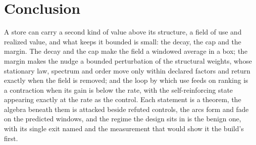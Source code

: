 \documentclass[11pt,a4paper]{article}
\theoremstyle{plain}
\theoremstyle{definition}
\begin{document}
\section{Conclusion}

A store can carry a second kind of value above its structure, a field of use and realized value,
and what keeps it bounded is small: the decay, the cap and the margin. The decay and the cap
make the field a windowed average in a box; the margin makes the nudge a bounded perturbation of
the structural weights, whose stationary law, spectrum and order move only within declared factors
and return exactly when the field is removed; and the loop by which use feeds on ranking is a
contraction when its gain is below the rate, with the self-reinforcing state appearing exactly at
the rate as the control. Each statement is a theorem, the algebra beneath them is attacked beside
refuted controls, the arcs form and fade on the predicted windows, and the regime the design sits
in is the benign one, with its single exit named and the measurement that would show it the
build's first.



\end{document}
